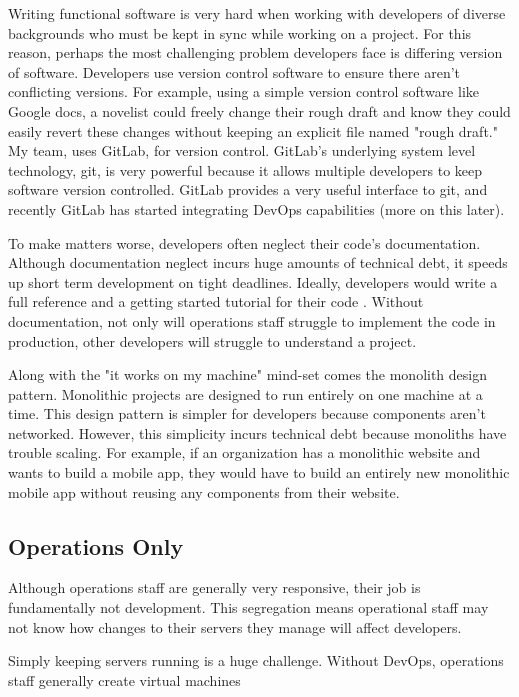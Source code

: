 \documentclass[titlepage]{article}
\begin{document}
Writing functional software is very hard when working with developers of diverse backgrounds who must be kept in sync while working on a project. For this reason, perhaps the most challenging problem developers face is differing version of software. Developers use version control software to ensure there aren’t conflicting versions. For example, using a simple version control software like Google docs, a novelist could freely change their rough draft and know they could easily revert these changes without keeping an explicit file named "rough draft." My team, uses GitLab, for version control. GitLab's underlying system level technology, git, is very powerful because it allows multiple developers to keep software version controlled. GitLab provides a very useful interface to git, and recently GitLab has started integrating DevOps capabilities (more on this later).

To make matters worse, developers often neglect their code's documentation. Although documentation neglect incurs huge amounts of technical debt, it speeds up short term development on tight deadlines. Ideally, developers would write a full reference and a getting started tutorial for their code \cite{Dagenais:2010:CED:1882291.1882312}. Without documentation, not only will operations staff struggle to implement the code in production, other developers will struggle to understand a project. 

Along with the "it works on my machine" mind-set comes the monolith design pattern. Monolithic projects are designed to run entirely on one machine at a time. This design pattern is simpler for developers because components aren't networked. However, this simplicity incurs technical debt because monoliths have trouble scaling. For example, if an organization has a monolithic website and wants to build a mobile app, they would have to build an entirely new monolithic mobile app without reusing any components from their website.

\subsection{Operations Only}

Although operations staff are generally very responsive, their job is fundamentally not development. This segregation means operational staff may not know how changes to their servers they manage will affect developers.

Simply keeping servers running is a huge challenge. Without DevOps, operations staff generally create virtual machines 
\end{document}
